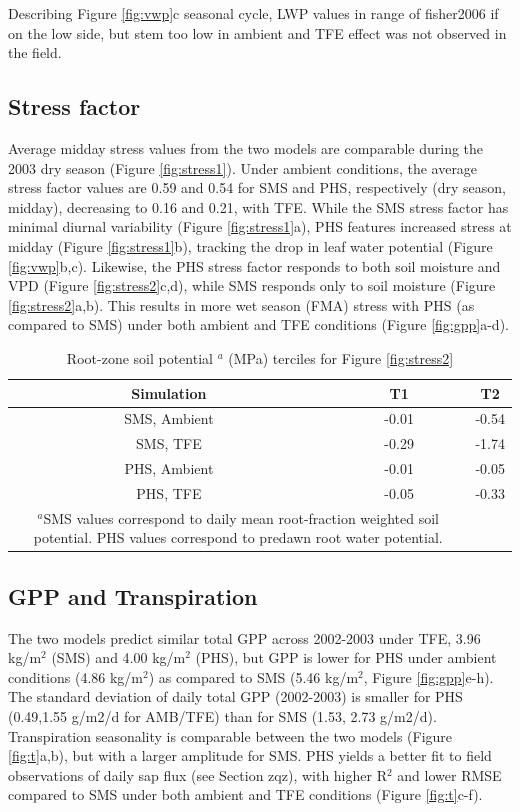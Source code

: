 \documentclass[draft,linenumbers]{agujournal}
\begin{document}
    Describing Figure \ref{fig:vwp}c
    seasonal cycle,
    LWP values in range of fisher2006 if on the low side,
    but stem too low in ambient and TFE effect was not observed in the field.


\subsection{Stress factor}
    
    Average midday stress values from the two models are comparable during the 2003 dry season (Figure \ref{fig:stress1}).
    Under ambient conditions, the average stress factor values are 0.59 and 0.54 for SMS and PHS, respectively (dry season, midday), 
    decreasing to 0.16 and 0.21, with TFE.
    While the SMS stress factor has minimal diurnal variability (Figure \ref{fig:stress1}a),
    PHS features increased stress at midday (Figure \ref{fig:stress1}b), tracking the drop in leaf water potential (Figure \ref{fig:vwp}b,c).
    Likewise, the PHS stress factor responds to both soil moisture and VPD (Figure \ref{fig:stress2}c,d), while SMS responds only to soil moisture (Figure \ref{fig:stress2}a,b).
    This results in more wet season (FMA) stress with PHS (as compared to SMS) under both ambient and TFE conditions (Figure \ref{fig:gpp}a-d).

\begin{table}
\caption{Root-zone soil potential $^a$ (MPa) terciles for Figure \ref{fig:stress2}}
\label{tab:tercile}
\centering
\begin{tabular}{c c c }
Simulation & T1 & T2 \\
\hline
SMS, Ambient & -0.01 & -0.54 \\
SMS, TFE & -0.29 & -1.74 \\
PHS, Ambient & -0.01 & -0.05 \\
PHS, TFE & -0.05 & -0.33 \\
\hline
\multicolumn{2}{p{.5\linewidth}}{$^{a}$SMS values correspond to daily mean root-fraction weighted soil potential.
PHS values correspond to predawn root water potential.}
\end{tabular}
\end{table}


\subsection{GPP and Transpiration}
    The two models predict similar total GPP across 2002-2003 under TFE, 3.96 kg/m$^2$ (SMS) and 4.00 kg/m$^2$ (PHS), 
    but GPP is lower for PHS under ambient conditions (4.86 kg/m$^2$) as compared to SMS (5.46 kg/m$^2$, Figure \ref{fig:gpp}e-h).
    The standard deviation of daily total GPP (2002-2003) is smaller for PHS (0.49,1.55 g/m2/d for AMB/TFE) than for SMS (1.53, 2.73 g/m2/d).
    Transpiration seasonality is comparable between the two models (Figure \ref{fig:t}a,b), but with a larger amplitude for SMS.
    PHS yields a better fit to field observations of daily sap flux (see Section zqz), with higher R$^2$ and lower RMSE compared to SMS 
    under both ambient and TFE conditions (Figure \ref{fig:t}c-f).
\end{document}

